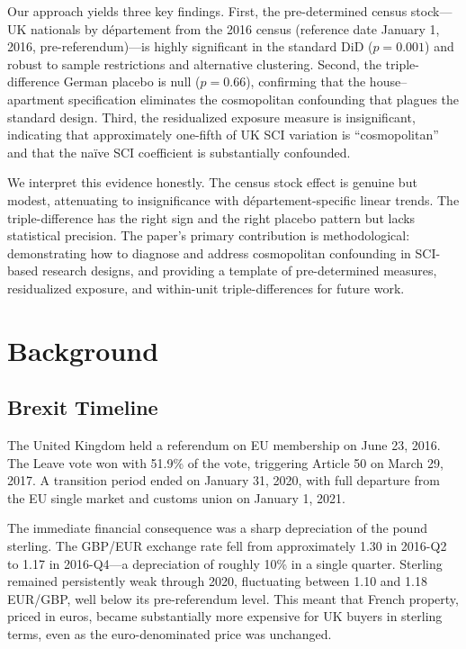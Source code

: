 \documentclass[12pt]{article}
\begin{document}
Our approach yields three key findings. First, the pre-determined census stock---UK nationals by d\'epartement from the 2016 census (reference date January 1, 2016, pre-referendum)---is highly significant in the standard DiD ($p = 0.001$) and robust to sample restrictions and alternative clustering. Second, the triple-difference German placebo is null ($p = 0.66$), confirming that the house--apartment specification eliminates the cosmopolitan confounding that plagues the standard design. Third, the residualized exposure measure is insignificant, indicating that approximately one-fifth of UK SCI variation is ``cosmopolitan'' and that the na\"ive SCI coefficient is substantially confounded.

We interpret this evidence honestly. The census stock effect is genuine but modest, attenuating to insignificance with d\'epartement-specific linear trends. The triple-difference has the right sign and the right placebo pattern but lacks statistical precision. The paper's primary contribution is methodological: demonstrating how to diagnose and address cosmopolitan confounding in SCI-based research designs, and providing a template of pre-determined measures, residualized exposure, and within-unit triple-differences for future work.



\section{Background}\label{sec:background}

\subsection{Brexit Timeline}

The United Kingdom held a referendum on EU membership on June 23, 2016. The Leave vote won with 51.9\% of the vote, triggering Article 50 on March 29, 2017. A transition period ended on January 31, 2020, with full departure from the EU single market and customs union on January 1, 2021.

The immediate financial consequence was a sharp depreciation of the pound sterling. The GBP/EUR exchange rate fell from approximately 1.30 in 2016-Q2 to 1.17 in 2016-Q4---a depreciation of roughly 10\% in a single quarter. Sterling remained persistently weak through 2020, fluctuating between 1.10 and 1.18 EUR/GBP, well below its pre-referendum level. This meant that French property, priced in euros, became substantially more expensive for UK buyers in sterling terms, even as the euro-denominated price was unchanged.
\end{document}
